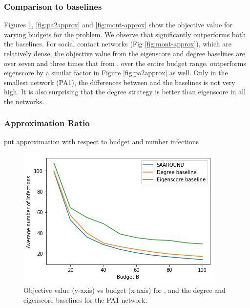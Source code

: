 \subsubsection{Comparison to baselines}
Figures \ref{fig:pa1approx}, \ref{fig:pa2approx} and \ref{fig:mont-approx} show the objective value
for varying budgets for the \probone{} problem. We observe that \algo{} significantly outperforms
both the baselines. For social contact networks (Fig \ref{fig:mont-approx}), which are relatively dense,
the objective value from the eigenscore and degree baselines are over seven and three times that from
\algo{}, over the entire budget range. \algo{} outperforms eigenscore by a similar factor in Figure \ref{fig:pa2approx} as well.
Only in the smallest network (PA1), the differences between \algo{} and the baselines is not very high.
It is also surprising that the degree strategy is better than eigenscore in all the networks.

\subsubsection{Approximation Ratio}

put approximation with respect to budget and number infections

\begin{figure}[!h]
    \centering
    \includegraphics[scale = 0.55]{Figuresnew/pa1_approx}
    \caption{Objective value (y-axis) vs budget (x-axis) for \algo{}, and the degree and eigenscore baselines for the PA1 network.}
    \label{fig:pa1approx}
\end{figure}

